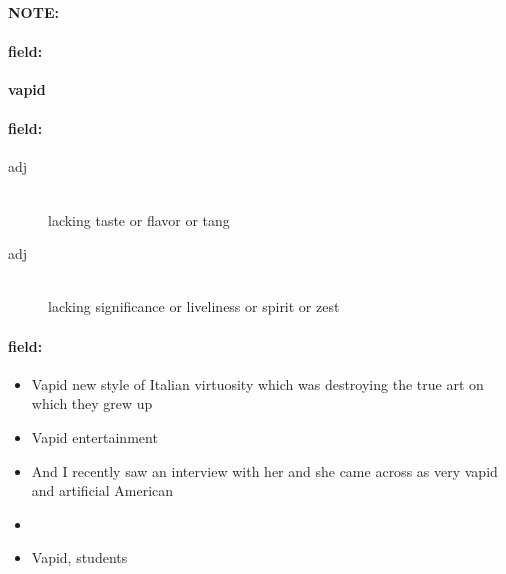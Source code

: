 \documentclass[12pt]{article}
\newenvironment{note}{\paragraph{NOTE:}}{}
\newenvironment{field}{\paragraph{field:}}{}
\begin{document}
\begin{note}
\begin{field}
\textbf{\large vapid}
\end{field}


\begin{field}
\begin{description}
\item[adj] \hfill \\ 
lacking taste or flavor or tang

\item[adj] \hfill \\ 
lacking significance or liveliness or spirit or zest

\end{description}
\end{field}

\begin{field}
\begin{itemize}
\item Vapid new style of Italian virtuosity which was destroying the true art on which they grew up
\item Vapid entertainment
\item And I recently saw an interview with her and she came across as very vapid and artificial American
\item 
\item Vapid, students
\end{itemize}
\end{field}
\end{note}
\end{document}
